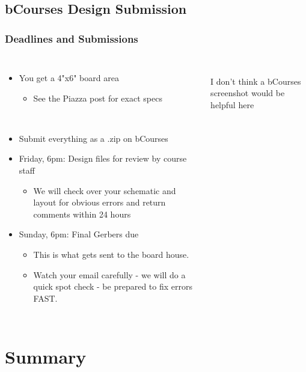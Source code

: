 \documentclass{beamer}
\begin{document}
\subsection{bCourses Design Submission}
\begin{frame}
\frametitle{Deadlines and Submissions}
\begin{columns}[t]
\begin{itemize}
  \item You get a 4"x6" board area
  \begin{itemize}
    \item See the Piazza post for exact specs
  \end{itemize}
  
  \hfill \\
  \item Submit everything as a .zip on bCourses
  \item Friday, 6pm: Design files for review by course staff
  \begin{itemize}
    \item We will check over your schematic and layout for obvious errors and return comments within 24 hours
  \end{itemize}
  \item Sunday, 6pm: Final Gerbers due
  \begin{itemize}
    \item This is what gets sent to the board house.
    \item Watch your email carefully - we will do a quick spot check - be prepared to fix errors FAST.
  \end{itemize}
\end{itemize}

\vspace{20mm} \\
{\centering I don't think a bCourses screenshot would be helpful here}
\end{columns}
\end{frame}

\section{Summary} %
\end{document}
